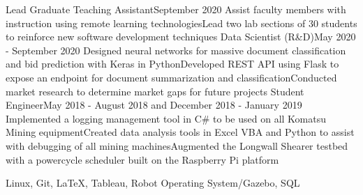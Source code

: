 \documentclass[letter]{article}
\begin{document}
                    {Lead Graduate Teaching Assistant}{September 2020}
                    {Assist faculty members with instruction using remote learning technologies}{Lead two lab sections of 30 students to reinforce new software development techniques}
		    \vspace{\interspace}
		    \newline
                    {Data Scientist (R\&D)}{May 2020 - September 2020}
                    {Designed neural networks for massive document classification and bid prediction with Keras in Python}{Developed REST API using Flask to expose an endpoint for document summarization and classification}{Conducted market research to determine market gaps for future projects}
		    \vspace{\interspace}
		    \newline
                    {Student Engineer}{May 2018 - August 2018 and December 2018 - January 2019}
                    {Implemented a logging management tool in C\# to be used on all Komatsu Mining equipment}{Created data analysis tools in Excel VBA and Python to assist with debugging of all mining machines}{Augmented the Longwall Shearer testbed with a powercycle scheduler built on the Raspberry Pi platform}
		    \vspace{\interspace}
		    \newline
	    \vspace{-\interspace}


              {Linux, Git, \LaTeX, Tableau, Robot Operating System/Gazebo, SQL}


\end{document}
